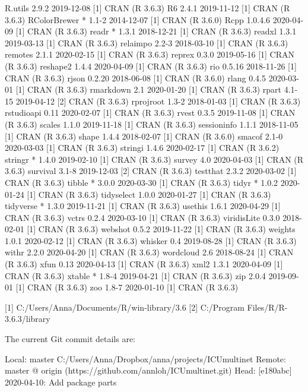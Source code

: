 \documentclass[a4paper,12pt]{article} %
\begin{document}
\begin{Schunk}
\begin{Soutput}
 R.utils          2.9.2      2019-12-08 [1] CRAN (R 3.6.3)
 R6               2.4.1      2019-11-12 [1] CRAN (R 3.6.3)
 RColorBrewer   * 1.1-2      2014-12-07 [1] CRAN (R 3.6.0)
 Rcpp             1.0.4.6    2020-04-09 [1] CRAN (R 3.6.3)
 readr          * 1.3.1      2018-12-21 [1] CRAN (R 3.6.3)
 readxl           1.3.1      2019-03-13 [1] CRAN (R 3.6.3)
 relaimpo         2.2-3      2018-03-10 [1] CRAN (R 3.6.3)
 remotes          2.1.1      2020-02-15 [1] CRAN (R 3.6.3)
 reprex           0.3.0      2019-05-16 [1] CRAN (R 3.6.3)
 reshape2         1.4.4      2020-04-09 [1] CRAN (R 3.6.3)
 rio              0.5.16     2018-11-26 [1] CRAN (R 3.6.3)
 rjson            0.2.20     2018-06-08 [1] CRAN (R 3.6.0)
 rlang            0.4.5      2020-03-01 [1] CRAN (R 3.6.3)
 rmarkdown        2.1        2020-01-20 [1] CRAN (R 3.6.3)
 rpart            4.1-15     2019-04-12 [2] CRAN (R 3.6.3)
 rprojroot        1.3-2      2018-01-03 [1] CRAN (R 3.6.3)
 rstudioapi       0.11       2020-02-07 [1] CRAN (R 3.6.3)
 rvest            0.3.5      2019-11-08 [1] CRAN (R 3.6.3)
 scales           1.1.0      2019-11-18 [1] CRAN (R 3.6.3)
 sessioninfo      1.1.1      2018-11-05 [1] CRAN (R 3.6.3)
 shape            1.4.4      2018-02-07 [1] CRAN (R 3.6.0)
 smacof           2.1-0      2020-03-03 [1] CRAN (R 3.6.3)
 stringi          1.4.6      2020-02-17 [1] CRAN (R 3.6.2)
 stringr        * 1.4.0      2019-02-10 [1] CRAN (R 3.6.3)
 survey           4.0        2020-04-03 [1] CRAN (R 3.6.3)
 survival         3.1-8      2019-12-03 [2] CRAN (R 3.6.3)
 testthat         2.3.2      2020-03-02 [1] CRAN (R 3.6.3)
 tibble         * 3.0.0      2020-03-30 [1] CRAN (R 3.6.3)
 tidyr          * 1.0.2      2020-01-24 [1] CRAN (R 3.6.3)
 tidyselect       1.0.0      2020-01-27 [1] CRAN (R 3.6.3)
 tidyverse      * 1.3.0      2019-11-21 [1] CRAN (R 3.6.3)
 usethis          1.6.1      2020-04-29 [1] CRAN (R 3.6.3)
 vctrs            0.2.4      2020-03-10 [1] CRAN (R 3.6.3)
 viridisLite      0.3.0      2018-02-01 [1] CRAN (R 3.6.3)
 webshot          0.5.2      2019-11-22 [1] CRAN (R 3.6.3)
 weights          1.0.1      2020-02-12 [1] CRAN (R 3.6.3)
 whisker          0.4        2019-08-28 [1] CRAN (R 3.6.3)
 withr            2.2.0      2020-04-20 [1] CRAN (R 3.6.3)
 wordcloud        2.6        2018-08-24 [1] CRAN (R 3.6.3)
 xfun             0.13       2020-04-13 [1] CRAN (R 3.6.3)
 xml2             1.3.1      2020-04-09 [1] CRAN (R 3.6.3)
 xtable         * 1.8-4      2019-04-21 [1] CRAN (R 3.6.3)
 zip              2.0.4      2019-09-01 [1] CRAN (R 3.6.3)
 zoo              1.8-7      2020-01-10 [1] CRAN (R 3.6.3)

[1] C:/Users/Anna/Documents/R/win-library/3.6
[2] C:/Program Files/R/R-3.6.3/library
\end{Soutput}
\end{Schunk}

The current Git commit details are:

\begin{Schunk}
\begin{Soutput}
Local:    master C:/Users/Anna/Dropbox/anna/projects/ICUmultinet
Remote:   master @ origin (https://github.com/annloh/ICUmultinet.git)
Head:     [e180abc] 2020-04-10: Add package parts
\end{Soutput}
\end{Schunk}
\end{document}
